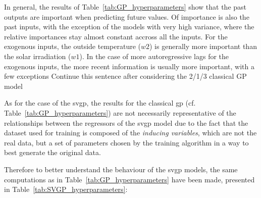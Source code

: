 In general, the results of Table~\ref{tab:GP_hyperparameters} show that the
past outputs are important when predicting future values. Of importance is also
the past inputs, with the exception of the models with very high variance, where
the relative importances stay almost constant accross all the inputs. For the
exogenous inputs, the outside temperature ($w2$) is generally more important
than the solar irradiation ($w1$). In the case of more autoregressive lags for
the exogenous inputs, the more recent information is usually more important,
with a few exceptions {\color{red} Continue this sentence after considering the
2/1/3 classical GP model}



As for the case of the \acrlong{svgp}, the results for the classical
\acrshort{gp} (cf. Table~\ref{tab:GP_hyperparameters}) are not necessarily
representative of the relationships between the regressors of the
\acrshort{svgp} model due to the fact that the dataset used for training is
composed of the \textit{inducing variables}, which are not the real data, but a
set of parameters chosen by the training algorithm in a way to best generate the
original data.

Therefore to better understand the behaviour of the \acrshort{svgp} models, the
same computations as in Table~\ref{tab:GP_hyperparameters} have been made,
presented in Table~\ref{tab:SVGP_hyperparameters}:

